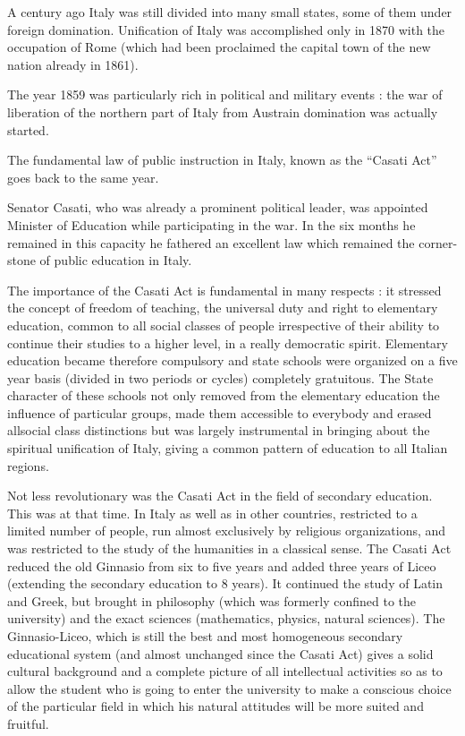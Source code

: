 A century ago Italy was still divided into many small states, some of them under foreign domination. Unification of Italy was accomplished only in 1870 with the occupation of Rome (which had been proclaimed the capital town of the new nation already in 1861).

The year 1859 was particularly rich in political and military events : the war of liberation of the northern part of Italy from Austrain domination was actually started.

The fundamental law of public instruction in Italy, known as the ``Casati Act'' goes back to the same year.

Senator Casati, who was already a prominent political leader, was appointed Minister of Education while participating in the war. In the six months he remained in this capacity he fathered an excellent law which remained the corner-stone of public education in Italy.

The importance of the Casati Act is fundamental in many respects : it stressed the concept of freedom of teaching, the universal duty and right to elementary education, common to all social classes of people irrespective of their ability to continue their studies to a higher level, in a really democratic spirit. Elementary education became therefore compulsory and state schools were organized on a five year basis (divided in two periods or cycles) completely gratuitous. The State character of these schools not only removed from the elementary education the influence of particular groups, made them accessible to everybody and erased all\pageoriginale social class distinctions but was largely instrumental in bringing about the spiritual unification of Italy, giving a common pattern of education to all Italian regions.

Not less revolutionary was the Casati Act in the field of secondary education. This was at that time. In Italy as well as in other countries, restricted to a limited number of people, run almost exclusively by religious organizations, and was restricted to the study of the humanities in a classical sense. The Casati Act reduced the old Ginnasio from six to five years and added three years of Liceo (extending the secondary education to 8 years). It continued the study of Latin and Greek, but brought in philosophy (which was formerly confined to the university) and the exact sciences (mathematics, physics, natural sciences). The Ginnasio-Liceo, which is still the best and most homogeneous secondary educational system (and almost unchanged since the Casati Act) gives a solid cultural background and a complete picture of all intellectual activities so as to allow the student who is going to enter the university to make a conscious choice of the particular field in which his natural attitudes will be more suited and fruitful.

